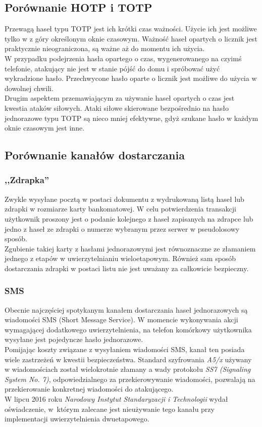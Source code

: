 \subsection{Porównanie HOTP i TOTP}
Przewagą haseł typu TOTP jest ich krótki czas ważności. 
Użycie ich jest możliwe tylko w z góry określonym oknie czasowym. 
Ważność haseł opartych o licznik jest praktycznie nieograniczona, są ważne aż do momentu ich użycia. \\
W przypadku podejrzenia hasła opartego o czas, wygenerowanego na czyimś telefonie, atakujący nie jest 
w stanie pójść do domu i spróbować użyć wykradzione hasło. 
Przechwycone hasło oparte o licznik jest możliwe do użycia w dowolnej chwili. \\
Drugim aspektem przemawiającym za używanie haseł opartych o czas jest kwestia ataków siłowych.
Ataki siłowe skierowane bezpośrednio na hasło jednorazowe typu TOTP są nieco mniej efektywne, gdyż 
szukane hasło w każdym oknie czasowym jest inne.

\subsection{Porównanie kanałów dostarczania}
\subsubsection{,,Zdrapka''}
Zwykle wysyłane pocztą w postaci dokumentu z wydrukowaną listą haseł lub zdrapki w rozmiarze 
karty bankomatowej. W celu potwierdzenia transakcji użytkownik proszony jest o podanie 
kolejnego z haseł zapisanych na zdrapce lub jedno z haseł ze zdrapki o numerze wybranym
przez serwer w pseudolosowy sposób. \\
Zgubienie takiej karty z hasłami jednorazowymi jest równoznaczne ze złamaniem jednego z etapów 
w uwierzytelnianiu wieloetapowym. Również sam sposób dostarczania zdrapki w postaci listu
nie jest uważany za całkowicie bezpieczny.

\subsubsection{SMS}
Obecnie najczęściej spotykanym kanałem dostarczania haseł jednorazowych są wiadomości SMS (Short Message Service). 
W momencie wykonywania akcji wymagającej dodatkowego uwierzytelnienia, na telefon komórkowy użytkownika 
wysyłane jest pojedyncze hasło jednorazowe. \\
Pomijając koszty związane z wysyłaniem wiadomości SMS, kanał ten posiada wiele zastrzeżeń w kwestii bezpieczeństwa.
Standard szyfrowania \textit{A5/x} używany w wiadomościach został wielokrotnie złamany a wady protokołu 
\textit{SS7 (Signaling System No. 7)}, odpowiedzialnego za przekierowywanie wiadomości, pozwalają na 
przekierowanie konkretnej wiadomości do atakującego. \\
W lipcu 2016 roku \textit{Narodowy Instytut Standaryzacji i Technologii} wydał oświadczenie, w~którym
zalecane jest nieużywanie tego kanału przy implementacji uwierzytelnienia dwuetapowego.

